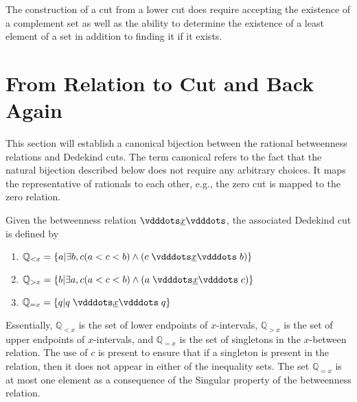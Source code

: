 \documentclass{rmj-public}
\newcommand{\qcut}[2][x]{\ensuremath{\mathbb{Q}_{#2 #1}}}
\newcommand{\qlt}[1][x]{\qcut[#1]{<}}
\newcommand{\qeq}[1][x]{\qcut[#1]{=}}
\newcommand{\qgt}[1][x]{\qcut[#1]{>}}
\begin{document}
The construction of a cut from a lower cut does require accepting the existence of a complement set as well as the ability to determine the existence of a least element of a set in addition to finding it if it exists. 

\section{From Relation to Cut and Back Again}

This section will establish a canonical bijection between the rational betweenness relations and Dedekind cuts. The term canonical refers to the fact that the natural bijection described below does not require any arbitrary choices. It maps the representative of rationals to each other, e.g., the zero cut is mapped to the zero relation. 

Given the betweenness relation $\xrel$, the associated Dedekind cut is defined by \begin{enumerate}
    \item $\qlt = \{ a | \exists b, c (a < c < b) \wedge (c \xrel b) \} $
    \item $\qgt = \{ b | \exists a, c (a < c < b) \wedge (a \xrel c) \} $
    \item $\qeq = \{ q | q \xrel q \} $
\end{enumerate}
Essentially, $\qlt$ is the set of lower endpoints of $x$-intervals, $\mathbb{Q}_{>x}$ is the set of upper endpoints of $x$-intervals, and $\qeq$ is the set of singletons in the $x$-between relation. The use of $c$ is present to ensure that if a singleton is present in the relation, then it does not appear in either of the inequality sets. The set $\qeq$ is at most one element as a consequence of the Singular property of the betweenness relation.
\end{document}
